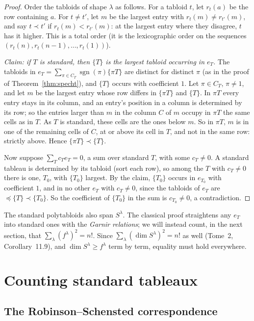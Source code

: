 \begin{proof}
Order the tabloids of shape $\lambda$ as follows. For a tabloid $t$, let $r_t(a)$ be the row containing $a$. For $t\ne t'$, let $m$ be the largest entry with $r_t(m)\ne r_{t'}(m)$, and say $t\prec t'$ if $r_t(m)<r_{t'}(m)$: at the largest
entry where they disagree, $t$ has it higher. This is a total order (it is the lexicographic order on the sequences $(r_t(n),r_t(n-1),\dots,r_t(1))$).

\emph{Claim: if $T$ is standard, then $\{T\}$ is the largest tabloid occurring in $e_T$.} The tabloids in $e_T=\sum_{\pi\in C_T}\operatorname{sgn}(\pi)\{\pi T\}$ are distinct for distinct $\pi$ (as in the proof of Theorem~\ref{thm:specht}), and
$\{T\}$ occurs with coefficient $1$. Let $\pi\in C_T$, $\pi\ne1$, and let $m$ be the largest entry whose row differs in $\{\pi T\}$ and $\{T\}$. In $\pi T$ every entry stays in its column, and an entry's position in a column is determined by its row;
so the entries larger than $m$ in the column $C$ of $m$ occupy in $\pi T$ the same cells as in $T$. As $T$ is standard, these cells are the ones below $m$. So in $\pi T$, $m$ is in one of the remaining cells of $C$, at or above its
cell in $T$, and not in the same row: strictly above. Hence $\{\pi T\}\prec\{T\}$.

Now suppose $\sum_Tc_Te_T=0$, a sum over standard $T$, with some $c_T\ne0$. A standard tableau is determined by its tabloid (sort each row), so among the $T$ with $c_T\ne0$ there is one, $T_0$, with $\{T_0\}$ largest. By the claim, $\{T_0\}$
occurs in $e_{T_0}$ with coefficient $1$, and in no other $e_T$ with $c_T\ne0$, since the tabloids of $e_T$ are $\preceq\{T\}\prec\{T_0\}$. So the coefficient of $\{T_0\}$ in the sum is $c_{T_0}\ne0$, a contradiction.
\end{proof}

The standard polytabloids also span $S^\lambda$. The classical proof straightens any $e_T$ into standard ones with the \emph{Garnir relations}; we will instead count, in the next section, that $\sum_\lambda(f^\lambda)^2=n!$. Since
$\sum_\lambda(\dim S^\lambda)^2=n!$ as well (Tome~2, Corollary~11.9), and $\dim S^\lambda\ge f^\lambda$ term by term, equality must hold everywhere.

\section{Counting standard tableaux}

\subsection*{The Robinson--Schensted correspondence}

